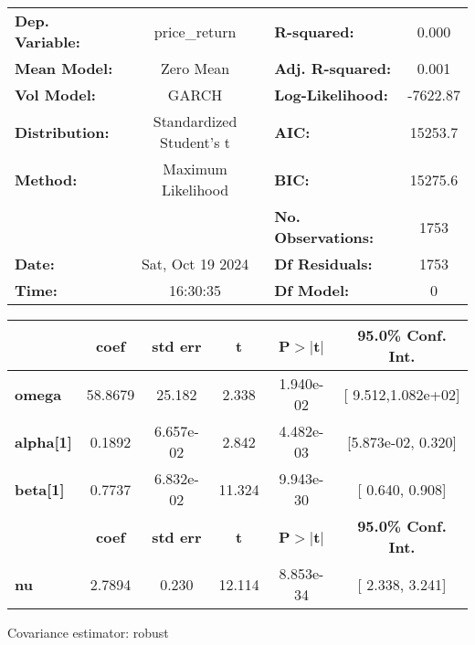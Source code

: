 \documentclass[
  number,
  preprint,
  3p,
  onecolumn]{elsarticle}
\begin{document}
\begin{center}
\begin{tabular}{lclc}
\toprule
\textbf{Dep. Variable:} &      price\_return       & \textbf{  R-squared:         } &     0.000   \\
\textbf{Mean Model:}    &        Zero Mean         & \textbf{  Adj. R-squared:    } &     0.001   \\
\textbf{Vol Model:}     &          GARCH           & \textbf{  Log-Likelihood:    } &   -7622.87  \\
\textbf{Distribution:}  & Standardized Student's t & \textbf{  AIC:               } &    15253.7  \\
\textbf{Method:}        &    Maximum Likelihood    & \textbf{  BIC:               } &    15275.6  \\
\textbf{}               &                          & \textbf{  No. Observations:  } &    1753     \\
\textbf{Date:}          &     Sat, Oct 19 2024     & \textbf{  Df Residuals:      } &    1753     \\
\textbf{Time:}          &         16:30:35         & \textbf{  Df Model:          } &     0       \\
\bottomrule
\end{tabular}
\begin{tabular}{lccccc}
                  & \textbf{coef} & \textbf{std err} & \textbf{t} & \textbf{P$> |$t$|$} & \textbf{95.0\% Conf. Int.}  \\
\midrule
\textbf{omega}    &      58.8679  &       25.182     &     2.338  &      1.940e-02       &    [  9.512,1.082e+02]      \\
\textbf{alpha[1]} &       0.1892  &    6.657e-02     &     2.842  &      4.482e-03       &    [5.873e-02,  0.320]      \\
\textbf{beta[1]}  &       0.7737  &    6.832e-02     &    11.324  &      9.943e-30       &     [  0.640,  0.908]       \\
            & \textbf{coef} & \textbf{std err} & \textbf{t} & \textbf{P$> |$t$|$} & \textbf{95.0\% Conf. Int.}  \\
\midrule
\textbf{nu} &       2.7894  &        0.230     &    12.114  &      8.853e-34       &     [  2.338,  3.241]       \\
\bottomrule
\end{tabular}
\end{center}

Covariance estimator: robust
\end{document}
